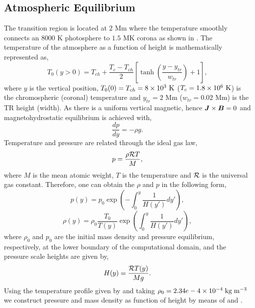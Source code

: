 \subsection{Atmospheric Equilibrium}
\label{sec:atmos_equil}
The transition region is located at $2$ Mm where the temperature smoothly connects an $8000$ K photosphere to $1.5$ MK corona as shown in . The temperature of the atmosphere as a function of height is mathematically represented as,   
\begin{equation}\label{te_pro}
T_0(y>0) = T_{ch}+\frac{T_{c} - T_{ch}}{2} \left[ \tanh \left( \frac{y-y_{tr}}{w_{tr}} \right)+1 \right],
\end{equation}
where $y$ is the vertical position, $T_0(0)=T_{ch}=8\times10^3 \ \rm{K}$ ($T_{c}=1.8\times10^6 \ \rm{K}$) is the chromospheric (coronal) temperature and $y_{tr}=2$ Mm ($w_{tr}=0.02$ Mm) is the TR height (width). As there is a uniform vertical magnetic, hence $\boldsymbol{J} \times \boldsymbol{B}=0$ and magnetohydrostatic equilibrium is achieved with,
\begin{equation}
\frac{dp}{dy} = - \rho g.
\end{equation}
Temperature and pressure are related through the ideal gas law,
\begin{equation}
p = \frac{ \rho \mathcal{R} T}{M},
\end{equation} 
where $M$ is the mean atomic weight, $T$ is the temperature and $\mathcal{R}$ is the universal gas constant. Therefore, one can obtain the $\rho$ and $p$ in the following form,  
\begin{equation}\label{p_pro}
p(y) = p_0 \exp \left( - \int_0^y  \frac{1}{H(y')} dy' \right), 
\end{equation} 
\begin{equation}\label{rho_pro}
\rho(y) = \rho_0 \frac{T_0}{T(y)} \exp \left( \int_0^y \frac{1}{H(y') }dy' \right),
\end{equation}
where $\rho_0$ and $p_0$ are the initial mass density and pressure equilibrium, respectively, at the lower boundary of the computational domain, and the pressure scale heights are given by,
\begin{equation}
H(y) = \frac{\mathcal{R} T(y)}{Mg}.
\end{equation}
Using the temperature profile given by  and taking $\rho_0 = 2.34e-4\times10^{-4}\;\rm{kg}\;\rm{m^{-3}}$ we construct pressure and mass density as function of height by means of  and .
